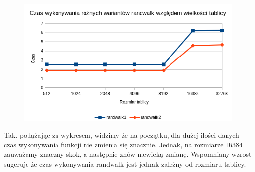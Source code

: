 \documentclass[a4paper,12pt]{mwart} %
\begin{document}
\begin{figure}[h!]
  \includegraphics[width=\linewidth]{graphs/graph4.png}
\end{figure}


Tak. podążając za wykresem, widzimy że na początku, dla dużej ilości danych czas wykonywania funkcji nie zmienia się znacznie. Jednak, na rozmiarze 16384 zauważamy znaczny skok, a następnie znów niewieką zmianę. Wspomniany wzrost sugeruje że czas wykonywania randwalk jest jednak zależny od rozmiaru tablicy.
\end{document}
